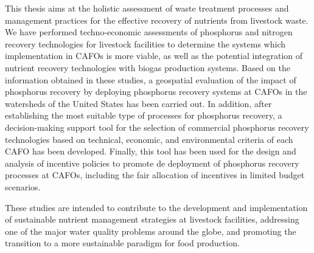 This thesis aims at the holistic assessment of waste treatment processes and management practices for the effective recovery of nutrients from livestock waste. We have performed techno-economic assessments of phosphorus and nitrogen recovery technologies for livestock facilities to determine the systems which implementation in CAFOs is more viable, as well as the potential integration of nutrient recovery technologies with biogas production systems. Based on the information obtained in these studies, a geospatial evaluation of the impact of phosphorus recovery by deploying phosphorus recovery systems at CAFOs in the watersheds of the United States has been carried out. In addition, after establishing the most suitable type of processes for phosphorus recovery, a decision-making support tool for the selection of commercial phosphorus recovery technologies based on technical, economic, and environmental criteria of each CAFO has been developed. Finally, this tool has been used for the design and analysis of incentive policies to promote de deployment of phosphorus recovery processes at CAFOs, including the fair allocation of incentives in limited budget scenarios.

These studies are intended to contribute to the development and implementation of sustainable nutrient management strategies at livestock facilities, addressing one of the major water quality problems around the globe, and promoting the transition to a more sustainable paradigm for food production.



\cleardoublepage


